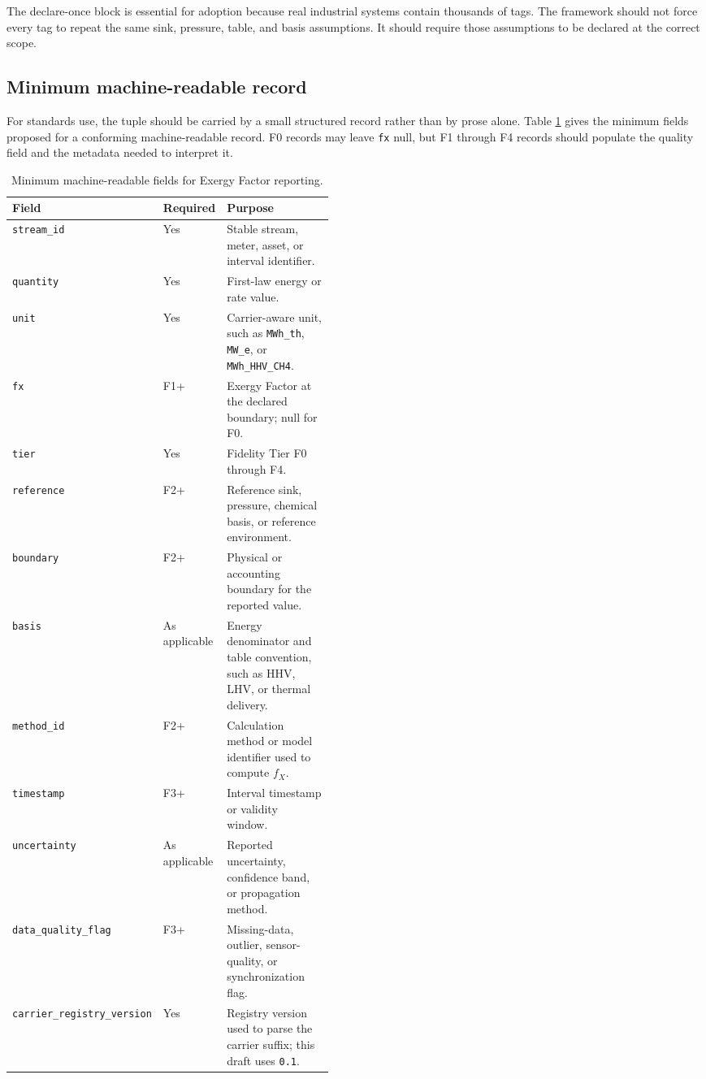 \documentclass[11pt]{article}
\newcommand{\fx}{f_X}
\begin{document}
The declare-once block is essential for adoption because real industrial systems contain thousands of tags. The framework should not force every tag to repeat the same sink, pressure, table, and basis assumptions. It should require those assumptions to be declared at the correct scope.

\subsection{Minimum machine-readable record}

For standards use, the tuple should be carried by a small structured record rather than by prose alone. Table \ref{tab:min_record} gives the minimum fields proposed for a conforming machine-readable record. F0 records may leave \texttt{fx} null, but F1 through F4 records should populate the quality field and the metadata needed to interpret it.

\begin{table}[H]
\centering
\small
\caption{Minimum machine-readable fields for Exergy Factor reporting.}
\label{tab:min_record}
\begin{tabularx}{\linewidth}{@{}p{0.32\linewidth}p{0.14\linewidth}X@{}}
\toprule
Field & Required & Purpose \\
\midrule
\texttt{stream\_id} & Yes & Stable stream, meter, asset, or interval identifier. \\
\texttt{quantity} & Yes & First-law energy or rate value. \\
\texttt{unit} & Yes & Carrier-aware unit, such as \texttt{MWh\_th}, \texttt{MW\_e}, or \texttt{MWh\_HHV\_CH4}. \\
\texttt{fx} & F1+ & Exergy Factor at the declared boundary; null for F0. \\
\texttt{tier} & Yes & Fidelity Tier F0 through F4. \\
\texttt{reference} & F2+ & Reference sink, pressure, chemical basis, or reference environment. \\
\texttt{boundary} & F2+ & Physical or accounting boundary for the reported value. \\
\texttt{basis} & As applicable & Energy denominator and table convention, such as HHV, LHV, or thermal delivery. \\
\texttt{method\_id} & F2+ & Calculation method or model identifier used to compute $\fx$. \\
\texttt{timestamp} & F3+ & Interval timestamp or validity window. \\
\texttt{uncertainty} & As applicable & Reported uncertainty, confidence band, or propagation method. \\
\texttt{data\_quality\_flag} & F3+ & Missing-data, outlier, sensor-quality, or synchronization flag. \\
\texttt{carrier\_registry\_version} & Yes & Registry version used to parse the carrier suffix; this draft uses \texttt{0.1}. \\
\bottomrule
\end{tabularx}
\end{table}
\end{document}
